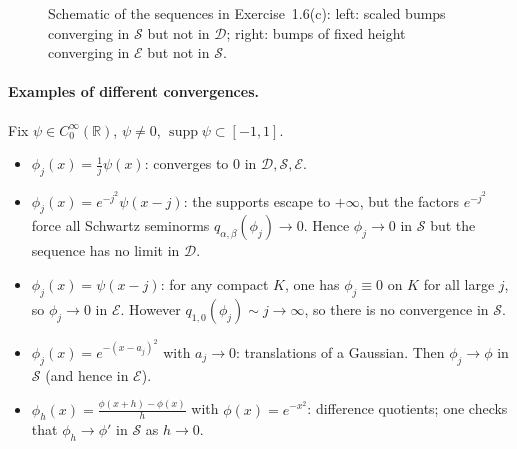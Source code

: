 \documentclass[12pt,a4paper]{article}
\theoremstyle{plain}
\theoremstyle{definition}
\theoremstyle{remark}
\theoremstyle{remark}
\begin{document}
\begin{figure}[ht]
\begin{minipage}{0.48\textwidth}
	\end{minipage}
	
	\caption{Schematic of the sequences in Exercise~1.6(c):
		left: scaled bumps converging in $\mathcal{S}$ but not in $\mathcal{D}$;
		right: bumps of fixed height converging in $\mathcal{E}$ but not in
		$\mathcal{S}$.}
	\label{fig:schwartz-escaping-support}
\end{figure}

\paragraph{Examples of different convergences.}

Fix $\psi\in C_0^\infty(\mathbb{R})$, $\psi\neq0$, $\operatorname{supp}\psi\subset[-1,1]$.

\begin{itemize}
	\item[(1)] $\displaystyle \phi_j(x) = \frac{1}{j}\psi(x)$:
	converges to $0$ in $\mathcal{D},\mathcal{S},\mathcal{E}$.
	
	\item[(2)] $\displaystyle \phi_j(x) = e^{-j^2}\psi(x-j)$:
	the supports escape to $+\infty$, but the factors $e^{-j^2}$ force
	all Schwartz seminorms $q_{\alpha,\beta}(\phi_j)\to 0$.  Hence
	$\phi_j\to 0$ in $\mathcal{S}$ but the sequence has no limit in
	$\mathcal{D}$.
	
	\item[(3)] $\displaystyle \phi_j(x) = \psi(x-j)$:
	for any compact $K$, one has $\phi_j\equiv 0$ on $K$ for all large $j$,
	so $\phi_j\to 0$ in $\mathcal{E}$.  However
	$q_{1,0}(\phi_j)\sim j\to\infty$, so there is no convergence in
	$\mathcal{S}$.
	
	\item[(4)] $\displaystyle \phi_j(x) = e^{-(x-a_j)^2}$ with $a_j\to 0$:
	translations of a Gaussian.  Then $\phi_j\to\phi$ in
	$\mathcal{S}$ (and hence in $\mathcal{E}$).
	
	\item[(5)] $\displaystyle \phi_h(x) = \frac{\phi(x+h)-\phi(x)}{h}$ with
	$\phi(x)=e^{-x^2}$:
	difference quotients; one checks that
	$\phi_h\to\phi'$ in $\mathcal{S}$ as $h\to0$.
\end{itemize}

\clearpage
\end{document}

